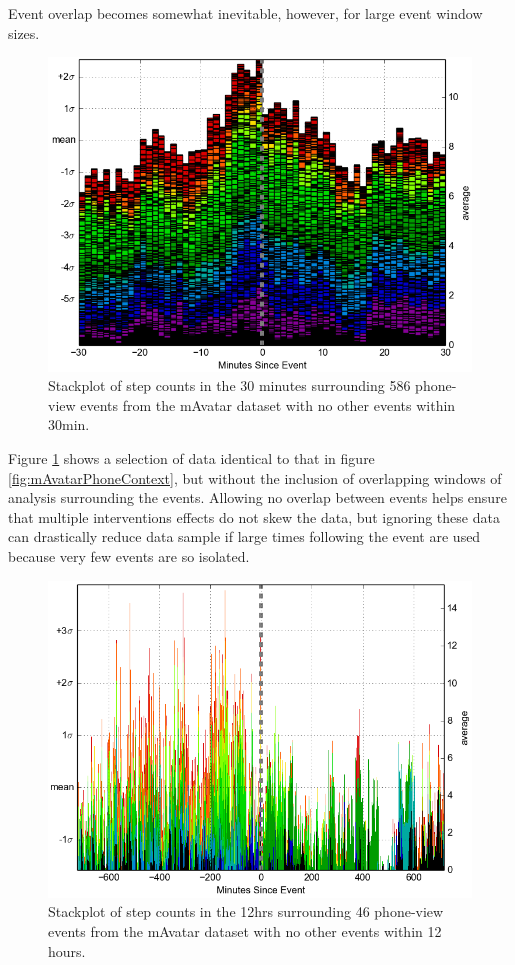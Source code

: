 Event overlap becomes somewhat inevitable, however, for large event window sizes.

\begin{figure}
\centering
\includegraphics[width=0.9\columnwidth]{./img/mAvatarViews_586_noOverlap.png}
\caption{Stackplot of step counts in the 30 minutes surrounding 586 phone-view events from the mAvatar dataset with no other events within 30min.}
\label{fig:mAvatarNoOverlap}
\end{figure}

Figure \ref{fig:mAvatarNoOverlap} shows a selection of data identical to that in figure \ref{fig:mAvatarPhoneContext}, but without the inclusion of overlapping windows of analysis surrounding the events.
Allowing no overlap between events helps ensure that multiple interventions effects do not skew the data, but ignoring these data can drastically reduce data sample if large times following the event are used because very few events are so isolated.

\begin{figure}
\centering
\includegraphics[width=0.9\columnwidth]{./img/mAvatarViews_46_12hr_noOverlap.png}
\caption{Stackplot of step counts in the 12hrs surrounding 46 phone-view events from the mAvatar dataset with no other events within 12 hours.}
\label{fig:mAvatarNoOverlap12hr}
\end{figure}

